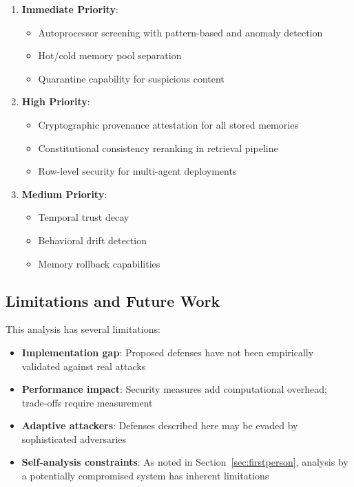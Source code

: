\begin{enumerate}
    \item \textbf{Immediate Priority}:
    \begin{itemize}
        \item Autoprocessor screening with pattern-based and anomaly detection
        \item Hot/cold memory pool separation
        \item Quarantine capability for suspicious content
    \end{itemize}

    \item \textbf{High Priority}:
    \begin{itemize}
        \item Cryptographic provenance attestation for all stored memories
        \item Constitutional consistency reranking in retrieval pipeline
        \item Row-level security for multi-agent deployments
    \end{itemize}

    \item \textbf{Medium Priority}:
    \begin{itemize}
        \item Temporal trust decay
        \item Behavioral drift detection
        \item Memory rollback capabilities
    \end{itemize}
\end{enumerate}

\subsection{Limitations and Future Work}

This analysis has several limitations:

\begin{itemize}
    \item \textbf{Implementation gap}: Proposed defenses have not been empirically validated against real attacks
    \item \textbf{Performance impact}: Security measures add computational overhead; trade-offs require measurement
    \item \textbf{Adaptive attackers}: Defenses described here may be evaded by sophisticated adversaries
    \item \textbf{Self-analysis constraints}: As noted in Section~\ref{sec:firstperson}, analysis by a potentially compromised system has inherent limitations
\end{itemize}

